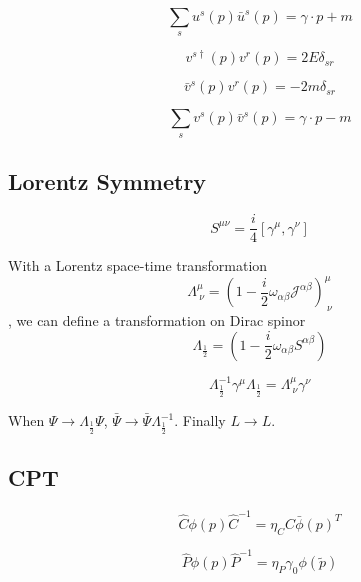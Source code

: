 \documentclass[12pt]{book}
\begin{document}
\begin{equation}
	\sum_s u^{s}(p)\bar u^s(p)=\gamma\cdot p+m
\end{equation}

\begin{equation}
	v^{s\dagger}(p)v^r(p)=2E\delta_{sr}
\end{equation}

\begin{equation}
	\bar v^{s}(p)v^r(p)=-2m\delta_{sr}
\end{equation}

\begin{equation}
	\sum_s v^{s}(p)\bar v^s(p)=\gamma\cdot p-m
\end{equation}

\subsection{Lorentz Symmetry}

\begin{equation}
	S^{\mu\nu}=\frac i4[\gamma^\mu,\gamma^\nu]
\end{equation}

With a Lorentz space-time transformation
\begin{equation}
	\Lambda^\mu_{\ \nu}=(1-\frac i2 \omega_{\alpha\beta}\mathcal J^{\alpha\beta})^\mu_{\ \nu}
\end{equation}
, we can define a transformation on Dirac spinor
\begin{equation}
	\Lambda_{\frac 12}=(1-\frac i2 \omega_{\alpha\beta}S^{\alpha\beta})
\end{equation}

\begin{equation}
	\Lambda_{\frac 12}^{-1}\gamma^\mu\Lambda_{\frac 12}=\Lambda^\mu_{\ \nu}\gamma^\nu
\end{equation}

When $\Psi\rightarrow \Lambda_{\frac 12}\Psi$, $\bar\Psi\rightarrow \bar\Psi\Lambda_{\frac 12}^{-1}$. Finally $L\rightarrow L$.

\subsection{CPT}

\begin{equation}
	\hat C\phi(p)\hat C^{-1}=\eta_C C\bar\phi(p)^T
\end{equation}

\begin{equation}
	\hat P\phi(p)\hat P^{-1}=\eta_P \gamma_0\phi(\tilde p)
\end{equation}
\end{document}

